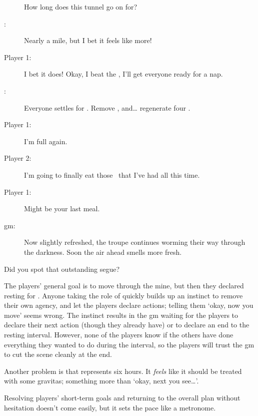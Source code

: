 \begin{multicols}{3}
\begin{description}
  How long does this tunnel go on for?
  \item[\Glsentrytext{gm}:]
  Nearly a mile, but I bet it feels like more!
  \item[Player 1:]
  I bet it does!
  Okay, I beat the , I'll get everyone ready for a nap.
  \item[\Glsentrytext{gm}:]
  Everyone settles for .
  Remove , and\ldots
  regenerate four .
  \item[Player 1:]
  I'm full again.
  \item[Player 2:]
  I'm going to finally eat those \rations\ that I've had all this time.
  \item[Player 1:]
  Might be your last meal.

  \item[\Gls{gm}:]
  Now slightly refreshed, the troupe continues worming their way through the darkness.
  Soon the air ahead smells more fresh.
\end{description}

\bigLine
\vspace{2em}
\noindent
Did you spot that outstanding segue?

The players' general goal is to move through the mine, but then they declared resting for .
Anyone taking the role of  quickly builds up an instinct to remove their own agency, and let the players declare actions; telling them `okay, now you move' seems wrong.
The instinct results in the \gls{gm} waiting for the players to declare their next action (though they already have) or to declare an end to the resting \gls{interval}.
However, none of the players know if the others have done everything they wanted to do during the \gls{interval}, so the players will trust the \gls{gm} to cut the scene cleanly at the end.

Another problem is that  represents six hours.
It \emph{feels} like it should be treated with some gravitas; something more than `okay, next you see\ldots'.

Resolving players' short-term goals and returning to the overall plan without hesitation doesn't come easily, but it sets the pace like a metronome.

\bigLine


\end{multicols}
